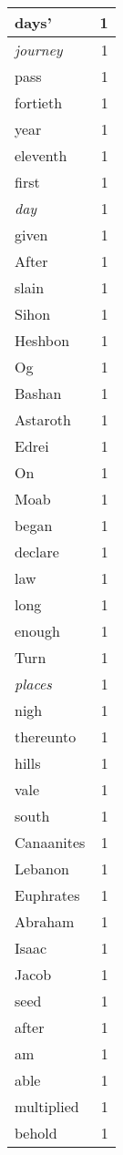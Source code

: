 \begin{center}
\begin{longtable}{l|r}
days' & 1 \\ \hline
\emph{journey} & 1 \\ \hline
pass & 1 \\ \hline
fortieth & 1 \\ \hline
year & 1 \\ \hline
eleventh & 1 \\ \hline
first & 1 \\ \hline
\emph{day} & 1 \\ \hline
given & 1 \\ \hline
After & 1 \\ \hline
slain & 1 \\ \hline
Sihon & 1 \\ \hline
Heshbon & 1 \\ \hline
Og & 1 \\ \hline
Bashan & 1 \\ \hline
Astaroth & 1 \\ \hline
Edrei & 1 \\ \hline
On & 1 \\ \hline
Moab & 1 \\ \hline
began & 1 \\ \hline
declare & 1 \\ \hline
law & 1 \\ \hline
long & 1 \\ \hline
enough & 1 \\ \hline
Turn & 1 \\ \hline
\emph{places} & 1 \\ \hline
nigh & 1 \\ \hline
thereunto & 1 \\ \hline
hills & 1 \\ \hline
vale & 1 \\ \hline
south & 1 \\ \hline
Canaanites & 1 \\ \hline
Lebanon & 1 \\ \hline
Euphrates & 1 \\ \hline
Abraham & 1 \\ \hline
Isaac & 1 \\ \hline
Jacob & 1 \\ \hline
seed & 1 \\ \hline
after & 1 \\ \hline
am & 1 \\ \hline
able & 1 \\ \hline
multiplied & 1 \\ \hline
behold & 1 \\ \hline

\end{longtable}
\end{center}
